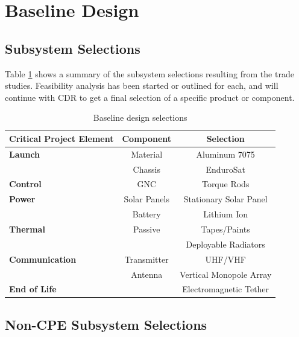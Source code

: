 
\section{Baseline Design}

\subsection{Subsystem Selections}
Table \ref{tbl:baseline} shows a summary of the subsystem selections resulting from the trade studies.  Feasibility analysis has been started or outlined for each, and will continue with CDR to get a final selection of a specific product or component.
\begin{table}[H]
\centering
\begin{tabular}{|l|c|c|} 
\hline
    \textbf{Critical Project Element} & \textbf{Component} & \textbf{Selection}
    \\
\hline
    \textbf{Launch} & Material & Aluminum 7075
    \\
\hline
    \textbf{} & Chassis & EnduroSat
    \\
\hline
    \textbf{Control} & GNC & Torque Rods
    \\
\hline
    \textbf{Power} & Solar Panels & Stationary Solar Panel
    \\
\hline 
    \textbf{} & Battery & Lithium Ion
    \\
\hline
    \textbf{Thermal} & Passive & Tapes/Paints
    \\
\hline
    \textbf{} & & Deployable Radiators
    \\
\hline
    \textbf{Communication} & Transmitter & UHF/VHF
    \\
\hline
    \textbf{} & Antenna & Vertical Monopole Array
    \\
\hline
    \textbf{End of Life} &  & Electromagnetic Tether
    \\    
\hline
\end{tabular}
\caption{Baseline design selections}
\label{tbl:baseline}
\end{table}

\subsection{Non-CPE Subsystem Selections}

